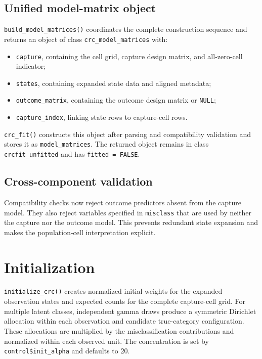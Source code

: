 \documentclass[11pt,letterpaper]{article}
\begin{document}
\subsection{Unified model-matrix object}

\texttt{build\_model\_matrices()} coordinates the complete construction
sequence and returns an object of class \texttt{crc\_model\_matrices} with:

\begin{itemize}
  \item \texttt{capture}, containing the cell grid, capture design matrix,
  and all-zero-cell indicator;
  \item \texttt{states}, containing expanded state data and aligned metadata;
  \item \texttt{outcome\_matrix}, containing the outcome design matrix or
  \texttt{NULL};
  \item \texttt{capture\_index}, linking state rows to capture-cell rows.
\end{itemize}

\texttt{crc\_fit()} constructs this object after parsing and compatibility
validation and stores it as \texttt{model\_matrices}. The returned object
remains in class \texttt{crcfit\_unfitted} and has \texttt{fitted = FALSE}.

\subsection{Cross-component validation}

Compatibility checks now reject outcome predictors absent from the capture
model. They also reject variables specified in \texttt{misclass} that are used
by neither the capture nor the outcome model. This prevents redundant state
expansion and makes the population-cell interpretation explicit.

\newpage

\section{Initialization}

\texttt{initialize\_crc()} creates normalized initial weights for the expanded
observation states and expected counts for the complete capture-cell grid. For
multiple latent classes, independent gamma draws produce a symmetric
Dirichlet allocation within each observation and candidate true-category
configuration. These allocations are multiplied by the misclassification
contributions and normalized within each observed unit. The concentration is
set by \texttt{control\$init\_alpha} and defaults to 20.
\end{document}

